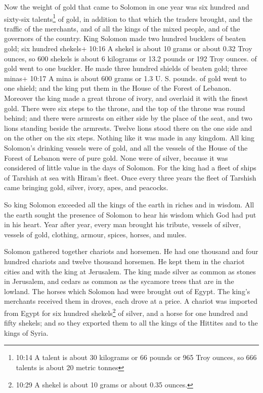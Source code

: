  Now the weight of gold that came to Solomon in one year
was six hundred and sixty-six talents\footnote{10:14 A talent is about
  30 kilograms or 66 pounds or 965 Troy ounces, so 666 talents is about
  20 metric tonnes} of gold,  in addition to that which the
traders brought, and the traffic of the merchants, and of all the kings
of the mixed people, and of the governors of the country. 
King Solomon made two hundred bucklers of beaten gold; six hundred
shekels+ 10:16 A shekel is about 10 grams or about 0.32 Troy ounces, so
600 shekels is about 6 kilograms or 13.2 pounds or 192 Troy ounces. of
gold went to one buckler.  He made three hundred shields of
beaten gold; three minas+ 10:17 A mina is about 600 grams or 1.3 U. S.
pounds. of gold went to one shield; and the king put them in the House
of the Forest of Lebanon.  Moreover the king made a great
throne of ivory, and overlaid it with the finest gold. 
There were six steps to the throne, and the top of the throne was round
behind; and there were armrests on either side by the place of the seat,
and two lions standing beside the armrests.  Twelve lions
stood there on the one side and on the other on the six steps. Nothing
like it was made in any kingdom.  All king Solomon's
drinking vessels were of gold, and all the vessels of the House of the
Forest of Lebanon were of pure gold. None were of silver, because it was
considered of little value in the days of Solomon.  For the
king had a fleet of ships of Tarshish at sea with Hiram's fleet. Once
every three years the fleet of Tarshish came bringing gold, silver,
ivory, apes, and peacocks.

 So king Solomon exceeded all the kings of the earth in
riches and in wisdom.  All the earth sought the presence of
Solomon to hear his wisdom which God had put in his heart. 
Year after year, every man brought his tribute, vessels of silver,
vessels of gold, clothing, armour, spices, horses, and mules.

 Solomon gathered together chariots and horsemen. He had
one thousand and four hundred chariots and twelve thousand horsemen. He
kept them in the chariot cities and with the king at Jerusalem.
 The king made silver as common as stones in Jerusalem, and
cedars as common as the sycamore trees that are in the lowland.
 The horses which Solomon had were brought out of Egypt.
The king's merchants received them in droves, each drove at a price.
 A chariot was imported from Egypt for six hundred
shekels\footnote{10:29 A shekel is about 10 grams or about 0.35 ounces.}
of silver, and a horse for one hundred and fifty shekels; and so they
exported them to all the kings of the Hittites and to the kings of
Syria.

